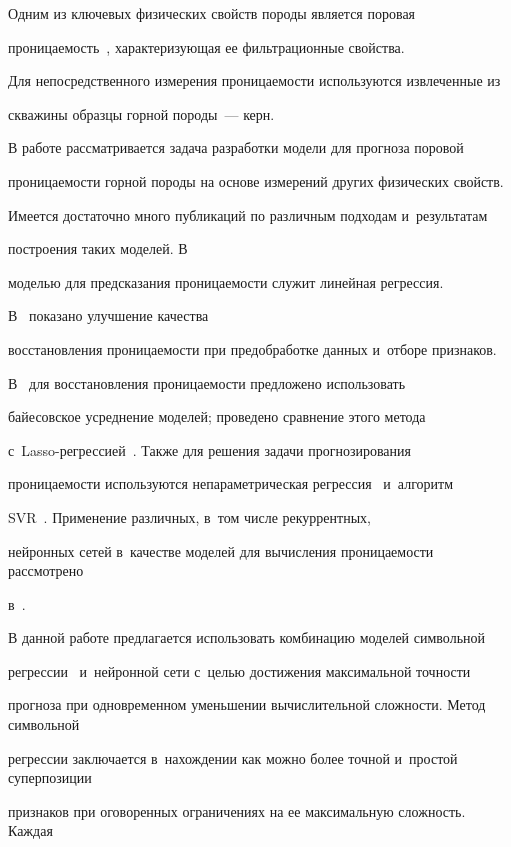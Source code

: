 Одним из ключевых физических свойств породы является поровая 

проницаемость~\cite{permeability}, характеризующая ее фильтрационные свойства. 

Для непосредственного измерения проницаемости используются извлеченные из 

скважины образцы горной породы~--- керн.



В работе рассматривается задача разработки модели для прогноза поровой 

проницаемости горной породы на основе измерений других физических свойств. 

Имеется достаточно много публикаций по различным подходам и~результатам 

построения таких моделей. В~\cite{regression2, regression1} 

моделью для предсказания проницаемости служит линейная регрессия. 

В~\cite{preprocessing1, feature_selection} показано улучшение качества 

восстановления проницаемости при предобработке данных и~отборе признаков. 

В~\cite{bma} для восстановления проницаемости предложено использовать 

байесовское усреднение моделей; проведено сравнение этого метода 

с~Lasso-регрес\-си\-ей~\cite{bma_vs_lasso}. Также для решения задачи прогнозирования 

проницаемости используются  непараметрическая регрессия~\cite{ace}  и~алгоритм 

SVR~\cite{svr}. Применение различных, в~том числе рекуррентных,

 нейронных сетей в~качестве моделей для вычисления проницаемости рассмотрено 

 в~\cite{nn1, nn2, nn3, nn4}.



В данной работе предлагается использовать комбинацию моделей символьной 

регрессии~\cite{rudoy} и~нейронной сети с~целью достижения максимальной точности 

прогноза при одновременном уменьшении вычислительной сложности. Метод символьной 

регрессии заключается в~нахождении как можно более точной и~простой суперпозиции 

признаков при оговоренных ограничениях на ее максимальную сложность. Каждая 

